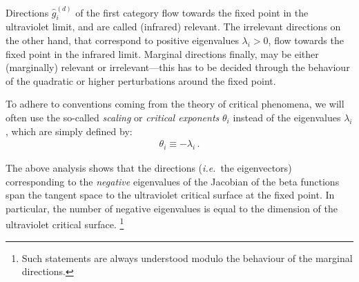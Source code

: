 \documentclass[11pt]{book}
\newcommand\ie{\textit{i.e.}\ }
\numberwithin{equation}{chapter}
\begin{document}
\bigskip
\noindent
{}
\bigskip

Directions $\hat g_i^{\scriptscriptstyle{(d)}}$ of the first
category flow towards the fixed point in the ultraviolet
limit, and are called (infrared) relevant. The irrelevant
directions
on the other hand,
that correspond to positive eigenvalues $\lambda_i > 0$,
flow towards the fixed point in the infrared limit.
Marginal directions finally, may be either (marginally)
relevant or irrelevant---this has to be decided
through the behaviour of the quadratic or higher
perturbations around the fixed point.

To adhere to conventions coming from the theory of critical
phenomena, we will often use the so-called \textit{scaling}
or \textit{critical exponents} $\theta_i$ instead of the
eigenvalues $\lambda_i$, which are simply defined by:
\begin{align}
  \theta_i \equiv - \lambda_i \,.
\end{align}

The above analysis shows that the directions (\ie the
eigenvectors) corresponding to the \textit{negative}
eigenvalues of the Jacobian of the beta functions
span the tangent space to the
ultraviolet critical surface at the fixed point.
In particular, the number of negative eigenvalues
is equal to the dimension of the ultraviolet critical
surface.%
\footnote{
  Such statements are always understood modulo the behaviour
  of the marginal directions.
}
\end{document}
